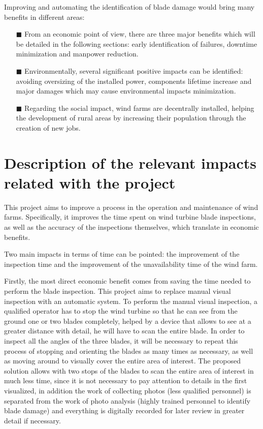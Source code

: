 Improving and automating the identification of blade damage would bring many benefits in different areas:
\begin{itemize}[]
    \item[\tiny$\blacksquare$]\textbf{}From an economic point of view, there are three major benefits which will be detailed in the following sections: early identification of failures, downtime minimization and manpower reduction.
    \item[\tiny$\blacksquare$] \textbf{}Environmentally, several significant positive impacts can be identified: avoiding oversizing of the installed power, components lifetime increase and major damages which may cause environmental impacts minimization.
    \item[\tiny$\blacksquare$] \textbf{}Regarding the social impact, wind farms are decentrally installed, helping the development of rural areas by increasing their population through the creation of new jobs.
\end{itemize}


\section{Description of the relevant impacts related with the project}
\label{sec:annexDescription}
This project aims to improve a process in the operation and maintenance of wind farms. Specifically, it improves the time spent on wind turbine blade inspections, as well as the accuracy of the inspections themselves, which translate in economic benefits.

Two main impacts in terms of time can be pointed: the improvement of the inspection time and the improvement of the unavailability time of the wind farm.

Firstly, the most direct economic benefit comes from saving the time needed to perform the blade inspection. This project aims to replace manual visual inspection with an automatic system. To perform the manual visual inspection, a qualified operator has to stop the wind turbine so that he can see from the ground one or two blades completely, helped by a device that allows to see at a greater distance with detail, he will have to scan the entire blade. In order to inspect all the angles of the three blades, it will be necessary to repeat this process of stopping and orienting the blades as many times as necessary, as well as moving around to visually cover the entire area of interest. The proposed solution allows with two stops of the blades to scan the entire area of interest in much less time, since it is not necessary to pay attention to details in the first visualized, in addition the work of collecting photos (less qualified personnel) is separated from the work of photo analysis (highly trained personnel to identify blade damage) and everything is digitally recorded for later review in greater detail if necessary.

